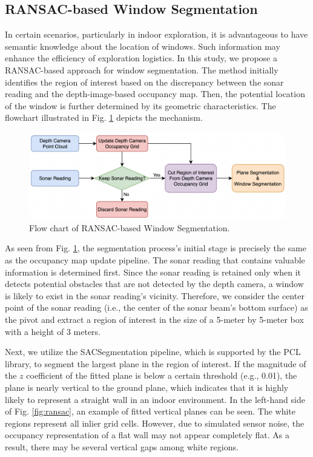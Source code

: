 \subsection{RANSAC-based Window Segmentation}
\label{sec:method_ransac}
In certain scenarios, particularly in indoor exploration, it is advantageous to have semantic knowledge about the location of windows. Such information may enhance the efficiency of exploration logistics. In this study, we propose a RANSAC-based approach for window segmentation. The method initially identifies the region of interest based on the discrepancy between the sonar reading and the depth-image-based occupancy map. Then, the potential location of the window is further determined by its geometric characteristics. The flowchart illustrated in Fig. \ref{fig:ransac_flow} depicts the mechanism.

\begin{figure}[h]
    \centering
    \includegraphics[width=1\columnwidth]{fig/ransac_flow.png}
    \caption{Flow chart of RANSAC-based Window Segmentation.}
    \label{fig:ransac_flow}
\end{figure}

As seen from Fig. \ref{fig:ransac_flow}, the segmentation process's initial stage is precisely the same as the occupancy map update pipeline. The sonar reading that contains valuable information is determined first. Since the sonar reading is retained only when it detects potential obstacles that are not detected by the depth camera, a window is likely to exist in the sonar reading's vicinity. Therefore, we consider the center point of the sonar reading (i.e., the center of the sonar beam's bottom surface) as the pivot and extract a region of interest in the size of a 5-meter by 5-meter box with a height of 3 meters.

Next, we utilize the SACSegmentation pipeline, which is supported by the PCL library, to segment the largest plane in the region of interest. If the magnitude of the $z$ coefficient of the fitted plane is below a certain threshold (e.g., 0.01), the plane is nearly vertical to the ground plane, which indicates that it is highly likely to represent a straight wall in an indoor environment. In the left-hand side of Fig. \ref{fig:ransac}, an example of fitted vertical planes can be seen. The white regions represent all inlier grid cells. However, due to simulated sensor noise, the occupancy representation of a flat wall may not appear completely flat. As a result, there may be several vertical gaps among white regions.

